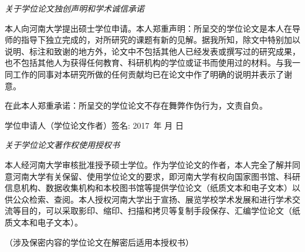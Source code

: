 {\pagestyle{empty}
\newpage
\vspace*{18pt}
\begin{center}{\heiti\em 关于学位论文独创声明和学术诚信承诺}\end{center}
\par\vspace*{20pt}
\renewcommand{\baselinestretch}{2}
{ \kaishu %
\begin{spacing}{1.5}
本人向河南大学提出硕士学位申请。本人郑重声明：所呈交的学位论文是本人在导师的指导下独立完成的，对所研究的课题有新的见解。据我所知，除文中特别加以说明、标注和致谢的地方外，论文中不包括其他人已经发表或撰写过的研究成果，也不包括其他人为获得任何教育、科研机构的学位或证书而使用过的材料。与我一同工作的同事对本研究所做的任何贡献均已在论文中作了明确的说明并表示了谢意。

在此本人郑重承诺：所呈交的学位论文不存在舞弊作伪行为，文责自负。
\end{spacing}
\vskip1cm

\hspace*{3cm}学位申请人（学位论文作者）签名: \raisebox{-1ex}{\underline{\makebox[4cm][c]{}}}
\vskip0.5cm
\hspace*{8.5cm}2017\ 年\hspace{0.8cm}   月 \hspace{0.8cm} 日\hspace{0.8cm}\par}

\vskip2cm
\begin{center}{\heiti\em 关于学位论文著作权使用授权书}\end{center}
\par\vspace*{18pt}
\renewcommand{\baselinestretch}{2}
{ \kaishu %
\begin{spacing}{1.5}
本人经河南大学审核批准授予硕士学位。作为学位论文的作者，本人完全了解并同意河南大学有关保留、使用学位论文的要求，即河南大学有权向国家图书馆、科研信息机构、数据收集机构和本校图书馆等提供学位论文（纸质文本和电子文本）以供公众检索、查阅。本人授权河南大学出于宣扬、展览学校学术发展和进行学术交流等目的，可以采取影印、缩印、扫描和拷贝等复制手段保存、汇编学位论文（纸质文本和电子文本）。

（涉及保密内容的学位论文在解密后适用本授权书）
\end{spacing}
\vskip1cm

}}
